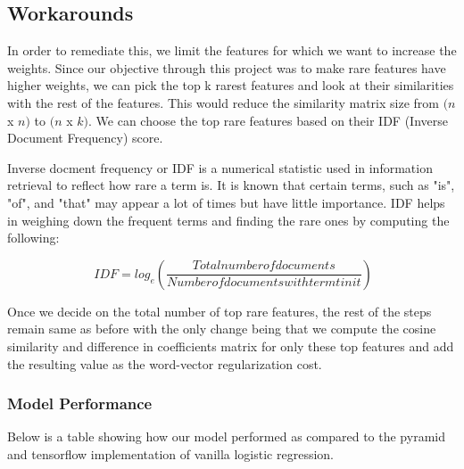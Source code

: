 \subsection{Workarounds}

In order to remediate this, we limit the features for which we want to increase the weights. Since our objective through this project was to make rare features have higher weights, we can pick the top k rarest features and look at their similarities with the rest of the features. This would reduce the similarity matrix size from $(n$ x $n)$ to $(n$ x $k)$. We can choose the top rare features based on their IDF (Inverse Document Frequency) score.

Inverse docment frequency or IDF is a numerical statistic used in information retrieval to reflect how rare a term is. It is known that certain terms, such as "is", "of", and "that" may appear a lot of times but have little importance. IDF helps in weighing down the frequent terms and finding the rare ones by computing the following:

\begin{equation}
\ IDF = log_e (\frac{Total number of documents}{Number of documents with term t in it})
\end{equation}

Once we decide on the total number of top rare features, the rest of the steps remain same as before with the only change being that we compute the cosine similarity and difference in coefficients matrix for only these top features and add the resulting value as the word-vector regularization cost.

\iffalse
\newpage
\subsubsection{Model Performance}

Below is a table showing how our model performed as compared to the pyramid and tensorflow implementation of vanilla logistic regression.

